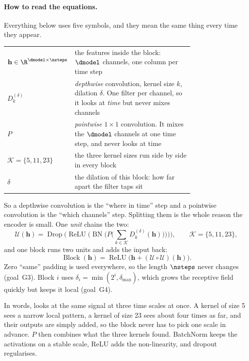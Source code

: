 \paragraph{How to read the equations.}
Everything below uses five symbols, and they mean the same thing every time they appear.

\begin{center}\small
\begin{tabular}{@{}l@{\quad}p{0.76\linewidth}@{}}
\toprule
$\mathbf{h} \in \R^{\dmodel \times \nsteps}$ & the features inside the block: $\dmodel$ channels,
one column per time step \\
$D_k^{(\delta)}$ & \emph{depthwise} convolution, kernel size $k$, dilation $\delta$. One filter per
channel, so it looks at \emph{time} but never mixes channels \\
$P$ & \emph{pointwise} $1\times1$ convolution. It mixes the $\dmodel$ channels at one time step, and
never looks at time \\
$\mathcal{K} = \{5,11,23\}$ & the three kernel sizes run side by side in every block \\
$\delta$ & the dilation of this block: how far apart the filter taps sit \\
\bottomrule
\end{tabular}
\end{center}

So a depthwise convolution is the ``where in time'' step and a pointwise convolution is the ``which
channels'' step. Splitting them is the whole reason the encoder is small. One \emph{unit} chains the
two:
\begin{equation}
  \mathcal{U}(\mathbf{h})
  = \operatorname{Drop}\Big(\operatorname{ReLU}\Big(\operatorname{BN}\Big(
      P\Big(\textstyle\sum_{k \in \mathcal{K}} D_k^{(\delta)}(\mathbf{h})\Big)\Big)\Big)\Big),
  \qquad \mathcal{K} = \{5, 11, 23\},
  \label{eq:unit}
\end{equation}
and one block runs two units and adds the input back:
\begin{equation}
  \operatorname{Block}(\mathbf{h}) = \operatorname{ReLU}\big(\mathbf{h} +
  (\mathcal{U} \circ \mathcal{U})(\mathbf{h})\big).
  \label{eq:block}
\end{equation}
Zero ``same'' padding is used everywhere, so the length $\nsteps$ never changes (goal~G3). Block $i$
uses $\delta_i = \min(2^i, \delta_{\max})$, which grows the receptive field quickly but keeps it
local (goal~G4).

In words,  looks at the same signal at three time scales at once. A kernel of size 5
sees a narrow local pattern, a kernel of size 23 sees about four times as far, and their outputs are
simply added, so the block never has to pick one scale in advance. $P$ then combines what the three
kernels found. BatchNorm \citep{ioffe2015batchnorm} keeps the activations on a stable scale, ReLU
adds the non-linearity, and dropout regularises.

